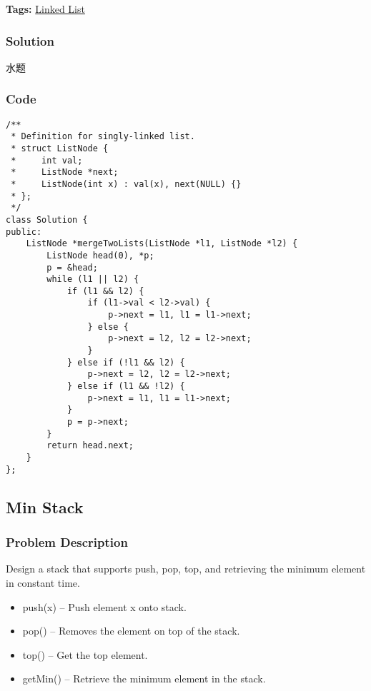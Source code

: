 \documentclass{article}
\begin{document}
\begin{CJK*}{UTF8}{gkai}
\textbf{Tags: }
\hyperref[ Linked List ]{ Linked List }



\subsubsection*{Solution}
水题

\subsubsection*{Code}
\begin{lstlisting}
/**
 * Definition for singly-linked list.
 * struct ListNode {
 *     int val;
 *     ListNode *next;
 *     ListNode(int x) : val(x), next(NULL) {}
 * };
 */
class Solution {
public:
    ListNode *mergeTwoLists(ListNode *l1, ListNode *l2) {
        ListNode head(0), *p;
        p = &head;
        while (l1 || l2) {
            if (l1 && l2) {
                if (l1->val < l2->val) {
                    p->next = l1, l1 = l1->next;
                } else {
                    p->next = l2, l2 = l2->next;
                }
            } else if (!l1 && l2) {
                p->next = l2, l2 = l2->next;
            } else if (l1 && !l2) {
                p->next = l1, l1 = l1->next;
            }
            p = p->next;
        }
        return head.next;
    }
}; 
\end{lstlisting}


\subsection{ Min Stack }
\label{ Min Stack }

\subsubsection*{Problem Description}
Design a stack that supports push, pop, top, and retrieving the minimum element in constant time.

\begin{itemize}
\item 
push(x) -- Push element x onto stack.

\item 
pop() -- Removes the element on top of the stack.

\item 
top() -- Get the top element.

\item 
getMin() -- Retrieve the minimum element in the stack.


\end{itemize}
\end{CJK*}
\end{document}
